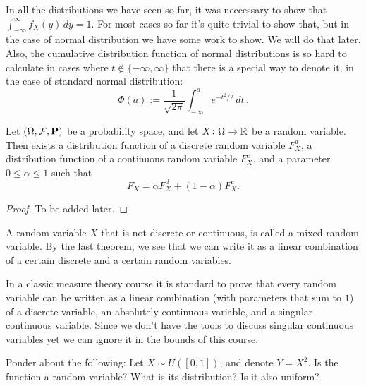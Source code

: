 \documentclass[11pt,a4paper]{article}
\begin{document}
  In all the distributions we have seen so far, it was neccessary to show
  that $\int_{-\infty}^{\infty} f_X(y)\,dy = 1$. For most cases so far
  it's quite trivial to show that, but in the case of normal distribution
  we have some work to show. We will do that later. 
  Also, the cumulative distribution function of normal distributions is so
  hard to calculate in cases where $t \notin \{-\infty,\infty\}$ that
  there is a special way to denote it, in the case of standard normal
  distribution:
  \[
    \Phi (a) :=
    \frac{1}{\sqrt{2 \pi}}
    \int_{-\infty}^{a} e^{-t^{2}/2}\,dt\,.
  \]
  
  \begin{theorem}
    Let $(\Omega, \mathcal F, \mathbf{P})$ be a probability space,
    and let $X \colon \Omega \to \mathbb{R}$ be a random variable.
    Then exists a distribution function of a discrete random variable
    $F_X^d$, a distribution function of a continuous random variable
    $F_X^c$, and a parameter $0 \le \alpha \le 1$ such that
    \[
      F_X = \alpha F_X^d + (1 - \alpha)F_X^c.
    \]
  \end{theorem}
  \begin{proof}
    To be added later.
  \end{proof}

  \begin{definition}
    A random variable $X$ that is not discrete or continuous, is called
    a mixed random variable. By the last theorem, we see that we can
    write it as a linear combination of a certain discrete and
    a certain random variables.
  \end{definition}
  
  \begin{remark}
    In a classic measure theory course it is standard to prove that every
    random variable can be written as a linear combination (with parameters
    that sum to $1$) of a discrete variable, an absolutely continuous variable,
    and a singular continuous variable. Since we don't have the tools to
    discuss singular continuous variables yet we can ignore it in the bounds
    of this course.
  \end{remark}
  
  Ponder about the following: 
  Let $X \sim U([0,1])$, and denote $Y = X^2$. Is the function a random
  variable? What is its distribution? Is it also uniform?
\end{document}
